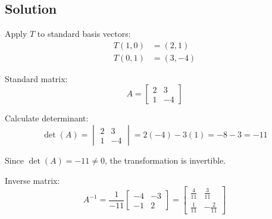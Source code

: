 \subsection*{Solution}

Apply $T$ to standard basis vectors:
\begin{align*}
	T(1,0) &= (2, 1) \\
	T(0,1) &= (3, -4)
\end{align*}

Standard matrix:
\[
	A = \begin{bmatrix}
		2 & 3 \\
		1 & -4
	\end{bmatrix}
\]

Calculate determinant:
\[
	\det(A) = \begin{vmatrix}
		2 & 3 \\
		1 & -4
	\end{vmatrix} = 2(-4) - 3(1) = -8 - 3 = -11
\]

Since $\det(A) = -11 \neq 0$, the transformation is invertible.

Inverse matrix:
\[
	A^{-1} = \frac{1}{-11}\begin{bmatrix}
		-4 & -3 \\
		-1 & 2
	\end{bmatrix} = \begin{bmatrix}
		\frac{4}{11} & \frac{3}{11} \\
		\frac{1}{11} & -\frac{2}{11}
	\end{bmatrix}
\]
